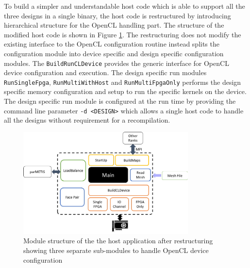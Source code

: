 To build a simpler and understandable host code which is able to support all the three
designs in a single binary, the host code is restructured by introducing hierarchical
structure for the OpenCL handling part. The structure of the modified host code is
shown in Figure \ref{fig:host_appstruc}. The restructuring does not modify the existing interface to the
OpenCL configuration routine instead splits the configuration module into device
specific and design specific configuration modules. The \texttt{BuildRunCLDevice}
provides the generic interface for OpenCL device configuration and execution.
The design specific run modules \texttt{RunSingleFpga}, \texttt{RunMultiWithHost}
and \texttt{RunMultiFpgaOnly} performs the design specific memory configuration
and setup to run the specific kernels on the device. The design specific run module
is configured at the run time by providing the command line parameter
\texttt{-d <DESIGN>} which allows a single host code to handle all the designs
without requirement for a recompilation.
\begin{figure}[ht]%
    \centering
    \includegraphics[width=0.8\textwidth]{images/host_appstruc}
    \caption{Module structure of the the host application after restructuring showing
    three separate sub-modules to handle OpenCL device configuration}
    \label{fig:host_appstruc}
\end{figure}

